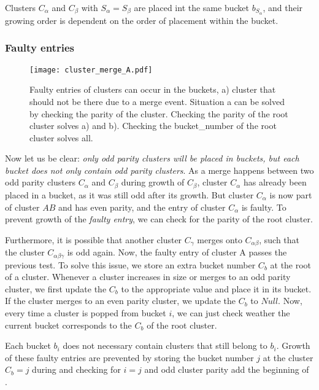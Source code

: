 \begin{lemma}\label{lem:bucket_suborder}
  Clusters $C_\alpha$ and $C_\beta$ with $S_\alpha = S_\beta$ are placed int the same bucket $b_{S_\alpha}$, and their growing order is dependent on the order of placement within the bucket.
\end{lemma}

\subsubsection{Faulty entries}

\begin{figure}
  \centering
  \texttt{[image: cluster\_merge\_A.pdf]}
  \caption{Faulty entries of clusters can occur in the buckets, a) cluster that should not be there due to a merge event. Situation a can be solved by checking the parity of the cluster. Checking the parity of the root cluster solves a) and b). Checking the bucket\_number of the root cluster solves all.}\label{3.fig.clustermergeB}
\end{figure}

Now let us be clear: \emph{only odd parity clusters will be placed in buckets, but each bucket does not only contain odd parity clusters}. As a merge happens between two odd parity clusters $C_\alpha$ and $C_\beta$ during growth of $C_\beta$, cluster $C_\alpha$ has already been placed in a bucket, as it was still odd after its growth. But cluster $C_\alpha$ is now part of cluster $AB$ and has even parity, and the entry of cluster $C_\alpha$ is faulty. To prevent growth of the \emph{faulty entry}, we can check for the parity of the root cluster.

Furthermore, it is possible that another cluster $C_\gamma$ merges onto $C_{\alpha\beta}$, such that the cluster $C_{\alpha\beta\gamma}$ is odd again. Now, the faulty entry of cluster A passes the previous test. To solve this issue, we store an extra bucket number $C_b$ at the root of a cluster. Whenever a cluster increases in size or merges to an odd parity cluster, we first update the $C_b$ to the appropriate value and place it in its bucket. If the cluster merges to an even parity cluster, we update the $C_b$ to $Null$. Now, every time a cluster is popped from bucket $i$, we can just check weather the current bucket corresponds to the $C_b$ of the root cluster.

\begin{lemma}\label{lem:bucket_faulty}
  Each bucket $b_i$ does not necessary contain clusters that still belong to $b_i$. Growth of these faulty entries are prevented by storing the bucket number $j$ at the cluster $C_b = j$ during  and checking for $i=j$ and odd cluster parity add the beginning of .
\end{lemma}

